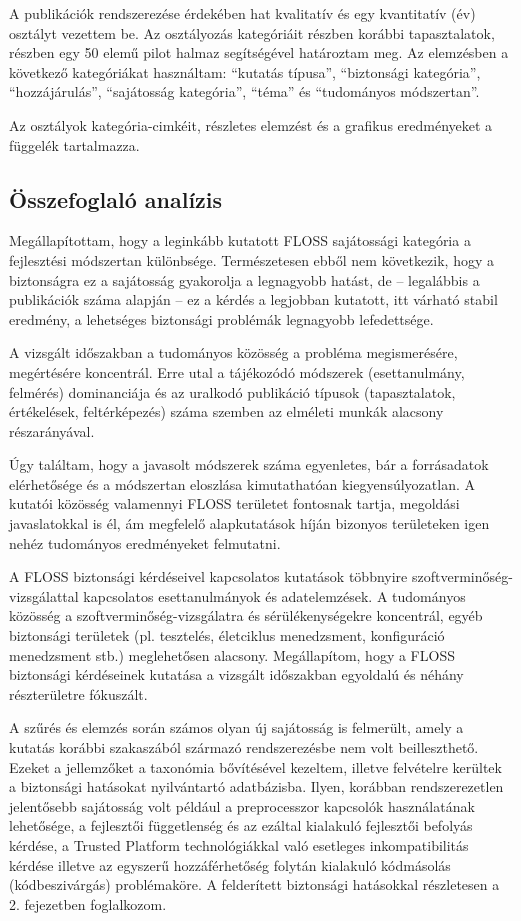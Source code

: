 \documentclass[12pt,magyar,a4paper,oneside]{scrreprt}
\begin{document}
A publikációk rendszerezése érdekében hat kvalitatív és egy kvantitatív
(év) osztályt vezettem be. Az osztályozás kategóriáit részben korábbi
tapasztalatok, részben egy 50 elemű pilot halmaz segítségével határoztam
meg. Az elemzésben a következő kategóriákat használtam: ``kutatás
típusa'', ``biztonsági kategória'', ``hozzájárulás'', ``sajátosság
kategória'', ``téma'' és ``tudományos módszertan''.

Az osztályok kategória-cimkéit, részletes elemzést és a grafikus
eredményeket a függelék tartalmazza.

\hypertarget{uxf6sszefoglaluxf3-analuxedzis}{%
\subsection{Összefoglaló
analízis}\label{uxf6sszefoglaluxf3-analuxedzis}}

Megállapítottam, hogy a leginkább kutatott FLOSS sajátossági kategória a
fejlesztési módszertan különbsége. Természetesen ebből nem következik,
hogy a biztonságra ez a sajátosság gyakorolja a legnagyobb hatást, de --
legalábbis a publikációk száma alapján -- ez a kérdés a legjobban
kutatott, itt várható stabil eredmény, a lehetséges biztonsági problémák
legnagyobb lefedettsége.

A vizsgált időszakban a tudományos közösség a probléma megismerésére,
megértésére koncentrál. Erre utal a tájékozódó módszerek (esettanulmány,
felmérés) dominanciája és az uralkodó publikáció típusok (tapasztalatok,
értékelések, feltérképezés) száma szemben az elméleti munkák alacsony
részarányával.

Úgy találtam, hogy a javasolt módszerek száma egyenletes, bár a
forrásadatok elérhetősége és a módszertan eloszlása kimutathatóan
kiegyensúlyozatlan. A kutatói közösség valamennyi FLOSS területet
fontosnak tartja, megoldási javaslatokkal is él, ám megfelelő
alapkutatások híján bizonyos területeken igen nehéz tudományos
eredményeket felmutatni.

A FLOSS biztonsági kérdéseivel kapcsolatos kutatások többnyire
szoftverminőség-vizsgálattal kapcsolatos esettanulmányok és
adatelemzések. A tudományos közösség a szoftverminőség-vizsgálatra és
sérülékenységekre koncentrál, egyéb biztonsági területek (pl. tesztelés,
életciklus menedzsment, konfiguráció menedzsment stb.) meglehetősen
alacsony. Megállapítom, hogy a FLOSS biztonsági kérdéseinek kutatása a
vizsgált időszakban egyoldalú és néhány részterületre fókuszált.

A szűrés és elemzés során számos olyan új sajátosság is felmerült, amely
a kutatás korábbi szakaszából származó rendszerezésbe nem volt
beilleszthető. Ezeket a jellemzőket a taxonómia bővítésével kezeltem,
illetve felvételre kerültek a biztonsági hatásokat nyilvántartó
adatbázisba. Ilyen, korábban rendszerezetlen jelentősebb sajátosság volt
például a preprocesszor kapcsolók használatának lehetősége, a fejlesztői
függetlenség és az ezáltal kialakuló fejlesztői befolyás kérdése, a
Trusted Platform technológiákkal való esetleges inkompatibilitás kérdése
illetve az egyszerű hozzáférhetőség folytán kialakuló kódmásolás
(kódbeszivárgás) problémaköre. A felderített biztonsági hatásokkal
részletesen a 2. fejezetben foglalkozom.
\end{document}
